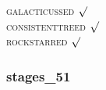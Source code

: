 


\textsc{galacticussed} $\surd$ \\
\textsc{consistenttreed} $\surd$ \\ 
\textsc{rockstarred} $\surd$


% 
%
%
%
%
%
%
%


\newpage
\subsubsection{stages\_51}

